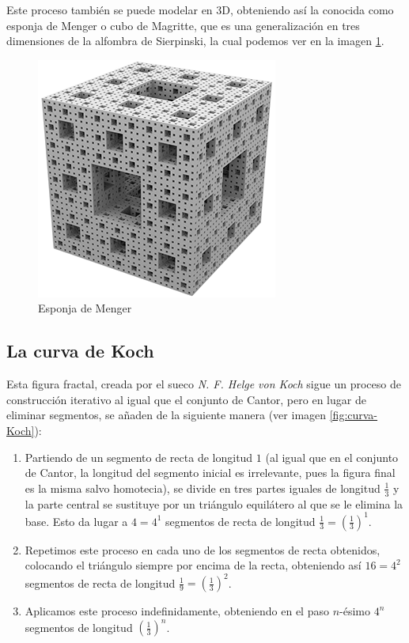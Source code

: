 Este proceso también se puede modelar en 3D, obteniendo así la conocida como esponja de Menger o cubo de Magritte, que es una generalización en tres dimensiones de la alfombra de Sierpinski, la cual podemos ver en la imagen \ref{fig:esponja-menger}.

\begin{figure} [ht]
\centering
\includegraphics[scale = 0.6]{img/esponja_menger.png}
\caption{Esponja de Menger}
 \label{fig:esponja-menger}
\end{figure}

\subsection{La curva de Koch}
\label{subsection:curva-Koch}

Esta figura fractal, creada por el sueco \textit{N. F. Helge von Koch} sigue un proceso de construcción iterativo al igual que el conjunto de Cantor, pero en lugar de eliminar segmentos, se añaden de la siguiente manera (ver imagen \ref{fig:curva-Koch}):

\begin{enumerate}
\item Partiendo de un segmento de recta de longitud $1$ (al igual que en el conjunto de Cantor, la longitud del segmento inicial es irrelevante, pues la figura final es la misma salvo homotecia), se divide en tres partes iguales de longitud $\frac 1 3$ y la parte central se sustituye por un triángulo equilátero al que se le elimina la base. Esto da lugar a $4=4^1$ segmentos de recta de longitud $\frac 1 3=\left(\frac 1 3\right)^1$.

\item Repetimos este proceso en cada uno de los segmentos de recta obtenidos, colocando el triángulo siempre por encima de la recta, obteniendo así $16=4^2$ segmentos de recta de longitud $\frac 1 9=\left(\frac 1 3\right)^2$.

\item Aplicamos este proceso indefinidamente, obteniendo en el paso $n$-ésimo $4^n$ segmentos de longitud $\left(\frac 1 3\right)^n$. 
\end{enumerate}

